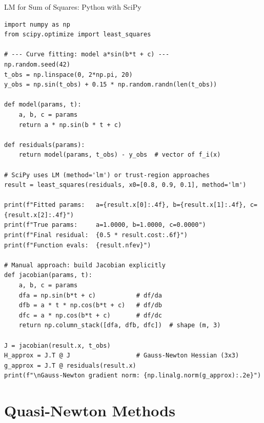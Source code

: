 \documentclass[aspectratio=169,10pt]{beamer}
\begin{document}
\begin{frame}[fragile]{LM for Sum of Squares: Python with SciPy}
\begin{lstlisting}[caption={LM for nonlinear least squares using scipy.optimize.least\_squares}]
import numpy as np
from scipy.optimize import least_squares

# --- Curve fitting: model a*sin(b*t + c) ---
np.random.seed(42)
t_obs = np.linspace(0, 2*np.pi, 20)
y_obs = np.sin(t_obs) + 0.15 * np.random.randn(len(t_obs))

def model(params, t):
    a, b, c = params
    return a * np.sin(b * t + c)

def residuals(params):
    return model(params, t_obs) - y_obs  # vector of f_i(x)

# SciPy uses LM (method='lm') or trust-region approaches
result = least_squares(residuals, x0=[0.8, 0.9, 0.1], method='lm')

print(f"Fitted params:   a={result.x[0]:.4f}, b={result.x[1]:.4f}, c={result.x[2]:.4f}")
print(f"True params:     a=1.0000, b=1.0000, c=0.0000")
print(f"Final residual:  {0.5 * result.cost:.6f}")
print(f"Function evals:  {result.nfev}")

# Manual approach: build Jacobian explicitly
def jacobian(params, t):
    a, b, c = params
    dfa = np.sin(b*t + c)           # df/da
    dfb = a * t * np.cos(b*t + c)   # df/db
    dfc = a * np.cos(b*t + c)       # df/dc
    return np.column_stack([dfa, dfb, dfc])  # shape (m, 3)

J = jacobian(result.x, t_obs)
H_approx = J.T @ J                  # Gauss-Newton Hessian (3x3)
g_approx = J.T @ residuals(result.x)
print(f"\nGauss-Newton gradient norm: {np.linalg.norm(g_approx):.2e}")
\end{lstlisting}
\end{frame}

\section{Quasi-Newton Methods}
\end{document}
